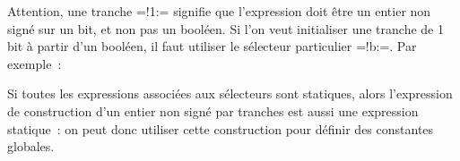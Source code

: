 Attention, une tranche \plm=!1:= signifie que l'expression doit être un entier non signé sur un bit, et non pas un booléen. Si l'on veut initialiser une tranche de 1 bit à partir d'un booléen, il faut utiliser le sélecteur particulier \plm=!b:=. Par exemple~:

Si toutes les expressions associées aux sélecteurs sont statiques, alors l'expression de construction d'un entier non signé par tranches est aussi une expression statique~: on peut donc utiliser cette construction pour définir des constantes globales.
